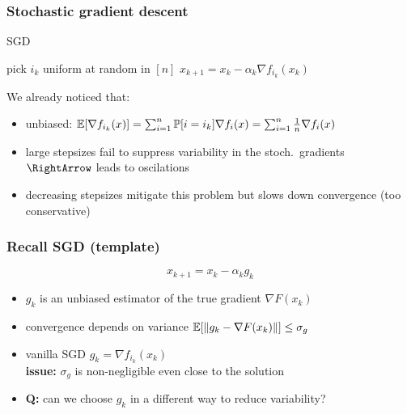\documentclass{beamer}
\begin{document}
\begin{frame}
  \frametitle{Stochastic gradient descent}
  \begin{algorithm}[H]
    \caption{SGD}\label{sgd}
    \begin{algorithmic}[1]
      \State pick $i_k$ uniform at random in $[n]$
      \State $x_{k+1} = x_k  - \alpha_k \nabla f_{i_k}(x_k)$
      \Endfor
    \end{algorithmic}
  \end{algorithm}

  We already noticed that:
  \begin{itemize}
    \item unbiased: $\mathbb{E}[\nabla f_{i_k}(x)] = \sum_{i=1}^{n} \mathbb{P}[i=i_k] \nabla f_i(x) = \sum_{i=1}^{n} \frac{1}{n} \nabla f_i(x)$
    \item large stepsizes fail to suppress variability in the stoch.\ gradients $\RightArrow$ leads to oscilations
    \item decreasing stepsizes mitigate this problem but slows down convergence (too conservative)
  \end{itemize}

\end{frame}


\begin{frame}
  \frametitle{Recall SGD (template)}
  \begin{equation}
    x_{k+1} = x_k - \alpha_k g_k
  \end{equation}
  \begin{itemize}
    \item $g_k$ is an unbiased estimator of the true gradient $\nabla F(x_k)$
    \item convergence depends on variance $\mathbb{E} [ \Vert g_k - \nabla F(x_k) \Vert ] \le \sigma_g$
    \item vanilla SGD $g_k = \nabla f_{i_k}(x_k)$ \\
          \textbf{issue:} $\sigma_g$ is non-negligible even close to the solution
    \item \textbf{Q:} can we choose $g_k$ in a different way to reduce variability?
  \end{itemize}

\end{frame}
\end{document}
